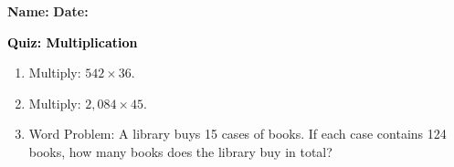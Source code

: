 \documentclass[12pt, letterpaper, fleqn]{article}
\begin{document}
\textbf{Name:} \underline{\hspace{5cm}}
\hfill
\textbf{Date:} \underline{\hspace{3cm}}\\

\begin{tcolorbox}[colback=customteal!20]
    \large\textcolor{black}{\textbf{Quiz: Multiplication}}
\end{tcolorbox}
\begin{enumerate}[itemsep=3.5cm, leftmargin=0.6cm]
\item Multiply: $542 \times 36$.
\vspace{3.5cm}
\item Multiply: $2,084 \times 45$.
\vspace{3.5cm}
\item Word Problem: A library buys 15 cases of books. If each case contains 124 books, how many books does the library buy in total?
\end{enumerate}
\end{document}
